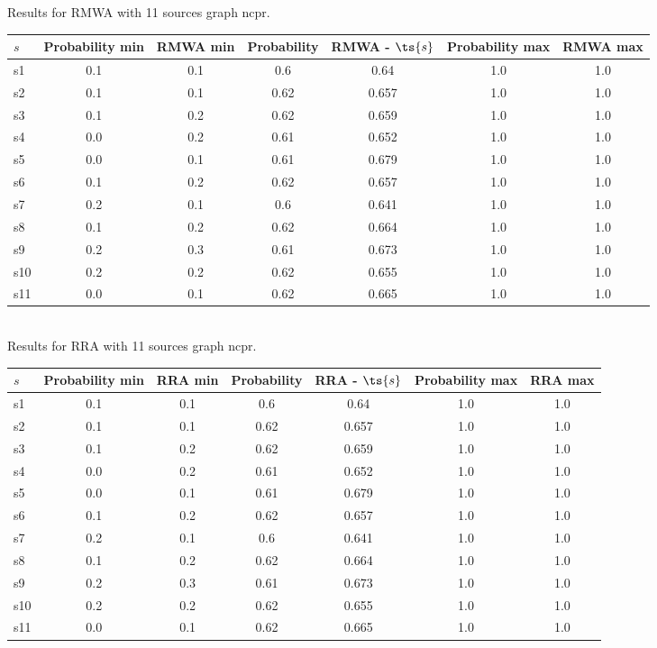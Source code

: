 \documentclass{article}
\begin{document}
\noindent Results for RMWA with 11 sources graph ncpr.

\noindent\begin{tabular}{|l|c|c|c|c|c|c|}
\hline
$s$& Probability min & RMWA min & Probability & RMWA - $\ts{s}$ & Probability max & RMWA max\\
\hline
s1 &0.1 & 0.1 & 0.6 & 0.64 & 1.0 & 1.0\\
\hline
s2 &0.1 & 0.1 & 0.62 & 0.657 & 1.0 & 1.0\\
\hline
s3 &0.1 & 0.2 & 0.62 & 0.659 & 1.0 & 1.0\\
\hline
s4 &0.0 & 0.2 & 0.61 & 0.652 & 1.0 & 1.0\\
\hline
s5 &0.0 & 0.1 & 0.61 & 0.679 & 1.0 & 1.0\\
\hline
s6 &0.1 & 0.2 & 0.62 & 0.657 & 1.0 & 1.0\\
\hline
s7 &0.2 & 0.1 & 0.6 & 0.641 & 1.0 & 1.0\\
\hline
s8 &0.1 & 0.2 & 0.62 & 0.664 & 1.0 & 1.0\\
\hline
s9 &0.2 & 0.3 & 0.61 & 0.673 & 1.0 & 1.0\\
\hline
s10 &0.2 & 0.2 & 0.62 & 0.655 & 1.0 & 1.0\\
\hline
s11 &0.0 & 0.1 & 0.62 & 0.665 & 1.0 & 1.0\\
\hline
\end{tabular}\\

\noindent Results for RRA with 11 sources graph ncpr.

\noindent\begin{tabular}{|l|c|c|c|c|c|c|}
\hline
$s$& Probability min & RRA min & Probability & RRA - $\ts{s}$ & Probability max & RRA max\\
\hline
s1 &0.1 & 0.1 & 0.6 & 0.64 & 1.0 & 1.0\\
\hline
s2 &0.1 & 0.1 & 0.62 & 0.657 & 1.0 & 1.0\\
\hline
s3 &0.1 & 0.2 & 0.62 & 0.659 & 1.0 & 1.0\\
\hline
s4 &0.0 & 0.2 & 0.61 & 0.652 & 1.0 & 1.0\\
\hline
s5 &0.0 & 0.1 & 0.61 & 0.679 & 1.0 & 1.0\\
\hline
s6 &0.1 & 0.2 & 0.62 & 0.657 & 1.0 & 1.0\\
\hline
s7 &0.2 & 0.1 & 0.6 & 0.641 & 1.0 & 1.0\\
\hline
s8 &0.1 & 0.2 & 0.62 & 0.664 & 1.0 & 1.0\\
\hline
s9 &0.2 & 0.3 & 0.61 & 0.673 & 1.0 & 1.0\\
\hline
s10 &0.2 & 0.2 & 0.62 & 0.655 & 1.0 & 1.0\\
\hline
s11 &0.0 & 0.1 & 0.62 & 0.665 & 1.0 & 1.0\\
\hline
\end{tabular}\\
\end{document}
